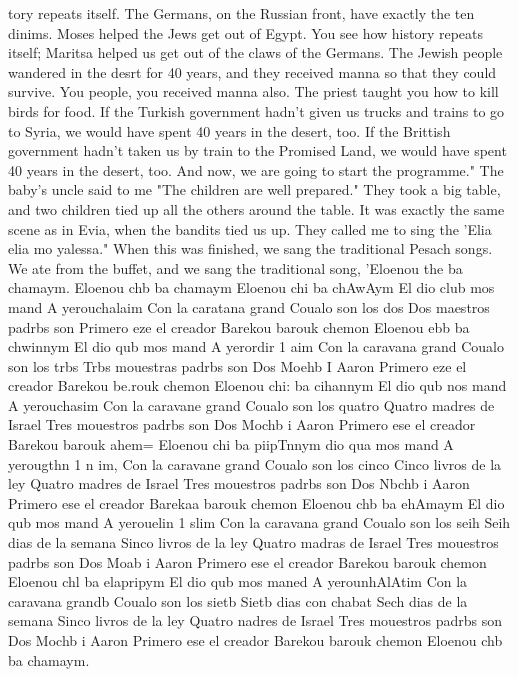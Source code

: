 tory repeats itself. The Germans, on the Russian front, have exactly the ten dinims. 
Moses helped the Jews get out of Egypt. You see how history repeats itself; Maritsa helped 
us get out of the claws of the Germans. The Jewish people wandered in the desrt for 40 
years, and they received manna so that they could survive. You people, you received manna 
also. The priest taught you how to kill birds for food. If the Turkish government hadn't 
given us trucks and trains to go to Syria, we would have spent 40 years in the desert, too. 
If the Brittish government hadn't taken us by train to the Promised Land, we would have 
spent 40 years in the desert, too. And now, we are going to start the programme." 
The baby's uncle said to me "The children are well prepared." They took a big table, 
and two children tied up all the others around the table. It was exactly the same scene 
as in Evia, when the bandits tied us up. They called me to sing the 'Elia elia mo yalessa." 
When this was finished, we sang the traditional Pesach songs. We ate from the buffet, 
and we sang the traditional song, 'Eloenou the ba chamaym. 
Eloenou chb ba chamaym 
Eloenou chi ba chAwAym 
El dio club mos mand 
A yerouchalaim 
Con la caratana grand 
Coualo son los dos 
Dos maestros padrbs son 
Primero eze el creador 
Barekou barouk chemon 
Eloenou ebb ba chwinnym 
El dio qub mos mand 
A yerordir 1 aim 
Con la caravana grand 
Coualo son los trbs 
Trbs mouestras padrbs son 
Dos Moehb I Aaron 
Primero eze el creador 
Barekou be.rouk chemon 
Eloenou chi: ba cihannym 
El dio qub nos mand 
A yerouchasim 
Con la caravane grand 
Coualo son los quatro 
Quatro madres de Israel 
Tres mouestros padrbs son 
Dos Mochb i Aaron 
Primero ese el creador 
Barekou barouk ahem= 
Eloenou chi ba piipTnnym 
dio qua mos mand 
A yerougthn 1 n im, 
Con la caravane grand 
Coualo son los cinco 
Cinco livros de la ley 
Quatro madres de Israel 
Tres mouestros padrbs son 
Dos Nbchb i Aaron 
Primero ese el creador 
Barekaa barouk chemon 
Eloenou chb ba ehAmaym 
El dio qub mos mand 
A yerouelin 1 slim 
Con la caravana grand 
Coualo son los seih 
Seih dias de la semana 
Sinco livros de la ley 
Quatro madras de Israel 
Tres mouestros padrbs son 
Dos Moab i Aaron 
Primero ese el creador 
Barekou barouk chemon 
Eloenou chl ba elapripym 
El dio qub mos maned 
A yerounhAlAtim 
Con la caravana grandb 
Coualo son los sietb 
Sietb dias con chabat 
Sech dias de la semana 
Sinco livros de la ley 
Quatro nadres de Israel 
Tres mouestros padrbs son 
Dos Mochb i Aaron 
Primero ese el creador 
Barekou barouk chemon 
Eloenou chb ba chamaym. 
